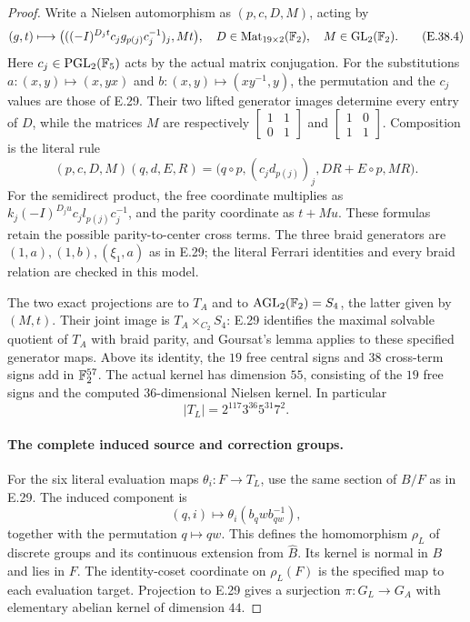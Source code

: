 \begin{proof}
Write a Nielsen automorphism as $(p,c,D,M)$, acting by
\[
 (g,t)\longmapsto
 \bigl(((-I)^{D_jt}c_jg_{p(j)}c_j^{-1})_j,Mt\bigr),
 \quad
 D\in\operatorname{Mat}_{19\times2}(\mathbb F_2),\quad
 M\in\operatorname{GL}_2(\mathbb F_2).
 \tag{E.38.4}
\]
Here $c_j\in\operatorname{PGL}_2(\mathbb F_5)$ acts by the
actual matrix conjugation.  For the substitutions
$a:(x,y)\mapsto(x,yx)$ and
$b:(x,y)\mapsto(xy^{-1},y)$, the permutation and
the $c_j$ values are those of E.29.  Their two
lifted generator images determine every entry of
$D$, while the matrices $M$ are respectively
$\left[\begin{smallmatrix}1&1\\0&1\end{smallmatrix}\right]$
and
$\left[\begin{smallmatrix}1&0\\1&1\end{smallmatrix}\right]$.
Composition is the literal rule
\[
 (p,c,D,M)(q,d,E,R)
   =\bigl(q\circ p,(c_jd_{p(j)})_j,
                  DR+E\circ p,MR\bigr).
 \tag{E.38.5}
\]
For the semidirect product, the free coordinate
multiplies as
$k_j(-I)^{D_ju}c_jl_{p(j)}c_j^{-1}$, and the
parity coordinate as $t+Mu$.
These formulas retain the possible parity-to-center
cross terms.  The three braid generators are
$(1,a),(1,b),(\xi_1,a)$ as in E.29; the literal
Ferrari identities and every braid relation are
checked in this model.

The two exact projections are to $T_A$ and to
$\operatorname{AGL}_2(\mathbb F_2)=S_4$, the latter
given by $(M,t)$.  Their joint image is
$T_A\times_{C_2}S_4$: E.29 identifies the maximal
solvable quotient of $T_A$ with braid parity,
and Goursat's lemma applies to these specified
generator maps.  Above its identity, the $19$
free central signs and $38$ cross-term signs
add in $\mathbb F_2^{57}$.  The actual kernel has
dimension $55$, consisting of the $19$ free
signs and the computed $36$-dimensional Nielsen
kernel.  In particular
\[
             |T_L|=2^{117}3^{36}5^{31}7^2.
 \tag{E.38.6}
\]

\paragraph{The complete induced source and correction groups.}
For the six literal evaluation maps
$\theta_i:F\to T_L$, use the same section of
$B/F$ as in E.29.  The induced component is
\[
 (q,i)\longmapsto\theta_i(b_qwb_{qw}^{-1}),
 \tag{E.38.7}
\]
together with the permutation $q\mapsto qw$.
This defines the homomorphism $\rho_L$ of discrete
groups and its continuous extension from $\widehat B$.
Its kernel is normal in $B$ and lies in $F$.
The identity-coset coordinate on $\rho_L(F)$ is
the specified map to each evaluation target.
Projection to E.29 gives a surjection
$\pi:G_L\to G_A$ with elementary abelian kernel
of dimension $44$.


\end{proof}
